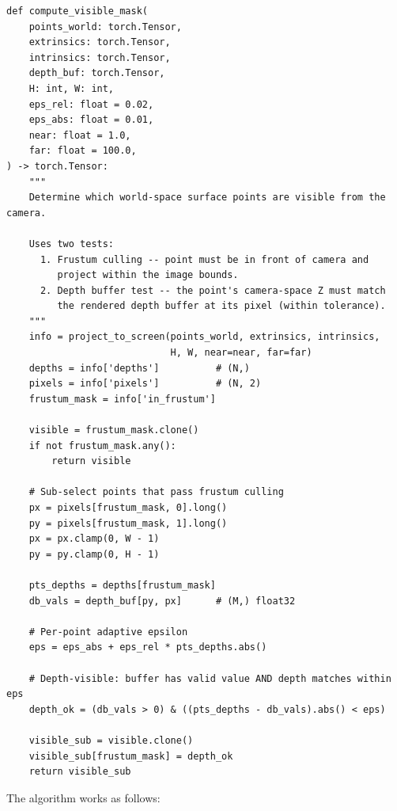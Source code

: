 \begin{lstlisting}
def compute_visible_mask(
    points_world: torch.Tensor,
    extrinsics: torch.Tensor,
    intrinsics: torch.Tensor,
    depth_buf: torch.Tensor,
    H: int, W: int,
    eps_rel: float = 0.02,
    eps_abs: float = 0.01,
    near: float = 1.0,
    far: float = 100.0,
) -> torch.Tensor:
    """
    Determine which world-space surface points are visible from the camera.

    Uses two tests:
      1. Frustum culling -- point must be in front of camera and
         project within the image bounds.
      2. Depth buffer test -- the point's camera-space Z must match
         the rendered depth buffer at its pixel (within tolerance).
    """
    info = project_to_screen(points_world, extrinsics, intrinsics,
                             H, W, near=near, far=far)
    depths = info['depths']          # (N,)
    pixels = info['pixels']          # (N, 2)
    frustum_mask = info['in_frustum']

    visible = frustum_mask.clone()
    if not frustum_mask.any():
        return visible

    # Sub-select points that pass frustum culling
    px = pixels[frustum_mask, 0].long()
    py = pixels[frustum_mask, 1].long()
    px = px.clamp(0, W - 1)
    py = py.clamp(0, H - 1)

    pts_depths = depths[frustum_mask]
    db_vals = depth_buf[py, px]      # (M,) float32

    # Per-point adaptive epsilon
    eps = eps_abs + eps_rel * pts_depths.abs()

    # Depth-visible: buffer has valid value AND depth matches within eps
    depth_ok = (db_vals > 0) & ((pts_depths - db_vals).abs() < eps)

    visible_sub = visible.clone()
    visible_sub[frustum_mask] = depth_ok
    return visible_sub
\end{lstlisting}

The algorithm works as follows:


